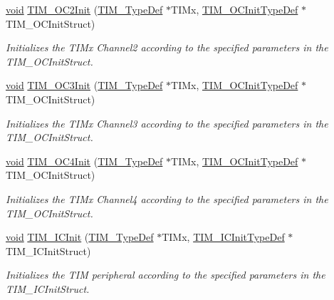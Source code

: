 \begin{DoxyCompactItemize}
\hyperlink{usb__devapi_8h_afabf60e7f57651d6d595a02c75f07cd0}{void} \hyperlink{group___t_i_m___exported___functions_ga2017455121d910d6ff63ac6f219842c5}{T\+I\+M\+\_\+\+O\+C2\+Init} (\hyperlink{struct_t_i_m___type_def}{T\+I\+M\+\_\+\+Type\+Def} $\ast$T\+I\+Mx, \hyperlink{struct_t_i_m___o_c_init_type_def}{T\+I\+M\+\_\+\+O\+C\+Init\+Type\+Def} $\ast$T\+I\+M\+\_\+\+O\+C\+Init\+Struct)
\begin{DoxyCompactList}\small\item\em Initializes the T\+I\+Mx Channel2 according to the specified parameters in the T\+I\+M\+\_\+\+O\+C\+Init\+Struct. \end{DoxyCompactList}\item 
\hyperlink{usb__devapi_8h_afabf60e7f57651d6d595a02c75f07cd0}{void} \hyperlink{group___t_i_m___exported___functions_ga90d4a358d4e6d4c5ed17dc1d6beb5f30}{T\+I\+M\+\_\+\+O\+C3\+Init} (\hyperlink{struct_t_i_m___type_def}{T\+I\+M\+\_\+\+Type\+Def} $\ast$T\+I\+Mx, \hyperlink{struct_t_i_m___o_c_init_type_def}{T\+I\+M\+\_\+\+O\+C\+Init\+Type\+Def} $\ast$T\+I\+M\+\_\+\+O\+C\+Init\+Struct)
\begin{DoxyCompactList}\small\item\em Initializes the T\+I\+Mx Channel3 according to the specified parameters in the T\+I\+M\+\_\+\+O\+C\+Init\+Struct. \end{DoxyCompactList}\item 
\hyperlink{usb__devapi_8h_afabf60e7f57651d6d595a02c75f07cd0}{void} \hyperlink{group___t_i_m___exported___functions_ga64571ebbb58cac39a9e760050175f11c}{T\+I\+M\+\_\+\+O\+C4\+Init} (\hyperlink{struct_t_i_m___type_def}{T\+I\+M\+\_\+\+Type\+Def} $\ast$T\+I\+Mx, \hyperlink{struct_t_i_m___o_c_init_type_def}{T\+I\+M\+\_\+\+O\+C\+Init\+Type\+Def} $\ast$T\+I\+M\+\_\+\+O\+C\+Init\+Struct)
\begin{DoxyCompactList}\small\item\em Initializes the T\+I\+Mx Channel4 according to the specified parameters in the T\+I\+M\+\_\+\+O\+C\+Init\+Struct. \end{DoxyCompactList}\item 
\hyperlink{usb__devapi_8h_afabf60e7f57651d6d595a02c75f07cd0}{void} \hyperlink{group___t_i_m___exported___functions_ga9e6a153dd6552e4e1188eba227316f7f}{T\+I\+M\+\_\+\+I\+C\+Init} (\hyperlink{struct_t_i_m___type_def}{T\+I\+M\+\_\+\+Type\+Def} $\ast$T\+I\+Mx, \hyperlink{struct_t_i_m___i_c_init_type_def}{T\+I\+M\+\_\+\+I\+C\+Init\+Type\+Def} $\ast$T\+I\+M\+\_\+\+I\+C\+Init\+Struct)
\begin{DoxyCompactList}\small\item\em Initializes the T\+IM peripheral according to the specified parameters in the T\+I\+M\+\_\+\+I\+C\+Init\+Struct. \end{DoxyCompactList}\item 

\end{DoxyCompactItemize}
